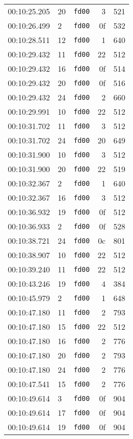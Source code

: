\documentclass{article}
\begin{document}
\begin{longtable}{lllrr}
00:10:25.205 & 20 & \texttt{fd00} & 3 & 521 \\
00:10:26.499 & 2 & \texttt{fd00} & 0f & 532 \\
00:10:28.511 & 12 & \texttt{fd00} & 1 & 640 \\
00:10:29.432 & 11 & \texttt{fd00} & 22 & 512 \\
00:10:29.432 & 16 & \texttt{fd00} & 0f & 514 \\
00:10:29.432 & 20 & \texttt{fd00} & 0f & 516 \\
00:10:29.432 & 24 & \texttt{fd00} & 2 & 660 \\
00:10:29.991 & 10 & \texttt{fd00} & 22 & 512 \\
00:10:31.702 & 11 & \texttt{fd00} & 3 & 512 \\
00:10:31.702 & 24 & \texttt{fd00} & 20 & 649 \\
00:10:31.900 & 10 & \texttt{fd00} & 3 & 512 \\
00:10:31.900 & 20 & \texttt{fd00} & 22 & 519 \\
00:10:32.367 & 2 & \texttt{fd00} & 1 & 640 \\
00:10:32.367 & 16 & \texttt{fd00} & 3 & 512 \\
00:10:36.932 & 19 & \texttt{fd00} & 0f & 512 \\
00:10:36.933 & 2 & \texttt{fd00} & 0f & 528 \\
00:10:38.721 & 24 & \texttt{fd00} & 0c & 801 \\
00:10:38.907 & 10 & \texttt{fd00} & 22 & 512 \\
00:10:39.240 & 11 & \texttt{fd00} & 22 & 512 \\
00:10:43.246 & 19 & \texttt{fd00} & 4 & 384 \\
00:10:45.979 & 2 & \texttt{fd00} & 1 & 648 \\
00:10:47.180 & 11 & \texttt{fd00} & 2 & 793 \\
00:10:47.180 & 15 & \texttt{fd00} & 22 & 512 \\
00:10:47.180 & 16 & \texttt{fd00} & 2 & 776 \\
00:10:47.180 & 20 & \texttt{fd00} & 2 & 793 \\
00:10:47.180 & 24 & \texttt{fd00} & 2 & 776 \\
00:10:47.541 & 15 & \texttt{fd00} & 2 & 776 \\
00:10:49.614 & 3 & \texttt{fd00} & 0f & 904 \\
00:10:49.614 & 17 & \texttt{fd00} & 0f & 904 \\
00:10:49.614 & 19 & \texttt{fd00} & 0f & 904 \\

\end{longtable}
\end{document}
